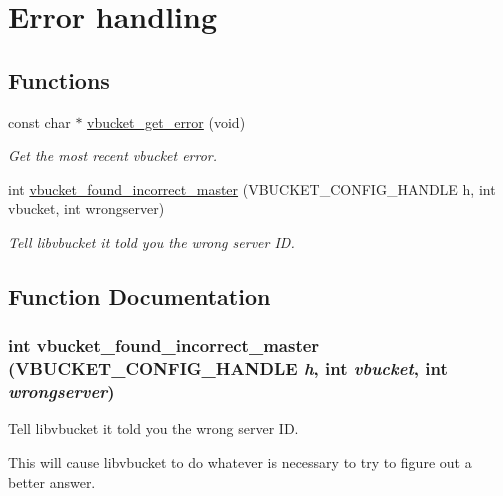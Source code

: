 \hypertarget{group__err}{
\section{Error handling}
\label{group__err}
}
\subsection*{Functions}
\begin{DoxyCompactItemize}
\item 
const char $\ast$ \hyperlink{group__err_ga3048aad4cad83312f3ddb23b238cde1a}{vbucket\_\-get\_\-error} (void)
\begin{DoxyCompactList}\small\item\em Get the most recent vbucket error. \item\end{DoxyCompactList}\item 
int \hyperlink{group__err_ga53d9ce1b5ea14045b19bea06c046c1c1}{vbucket\_\-found\_\-incorrect\_\-master} (VBUCKET\_\-CONFIG\_\-HANDLE h, int vbucket, int wrongserver)
\begin{DoxyCompactList}\small\item\em Tell libvbucket it told you the wrong server ID. \item\end{DoxyCompactList}\end{DoxyCompactItemize}


\subsection{Function Documentation}
\hypertarget{group__err_ga53d9ce1b5ea14045b19bea06c046c1c1}{
\subsubsection[{vbucket\_\-found\_\-incorrect\_\-master}]{\setlength{\rightskip}{0pt plus 5cm}int vbucket\_\-found\_\-incorrect\_\-master (VBUCKET\_\-CONFIG\_\-HANDLE {\em h}, \/  int {\em vbucket}, \/  int {\em wrongserver})}}
\label{group__err_ga53d9ce1b5ea14045b19bea06c046c1c1}


Tell libvbucket it told you the wrong server ID. 

This will cause libvbucket to do whatever is necessary to try to figure out a better answer.


